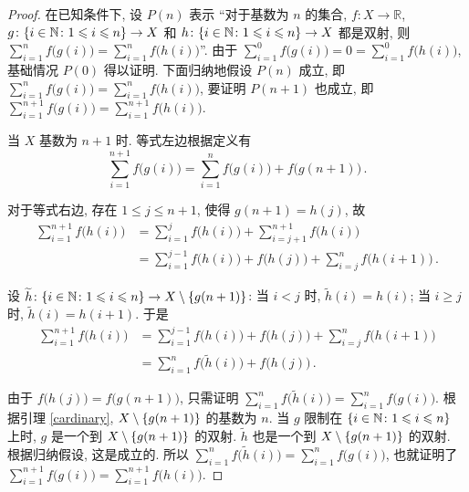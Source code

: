 \documentclass[UTF8]{ctexart}
\theoremstyle{mystyle}
\theoremstyle{myremark}
\theoremstyle{plain}
\newcommand{\R}{\mathbb R}
\newcommand{\N}{\mathbb N}
\DeclarePairedDelimiter\set{\{}{\}}
\begin{document}
\begin{proof}
    在已知条件下, 设 $ P(n) $ 表示 ``对于基数为 $ n $ 的集合, $ f \colon X \to \R $, $ g \colon \set{i \in \N \colon 1 \leqslant i \leqslant n} \to X $ 和 $ h \colon \set{i \in \N \colon 1 \leqslant i \leqslant n} \to X $ 都是双射, 则 $\displaystyle \sum_{i = 1}^{n} f \big( g(i) \big) = \sum_{i = 1}^{n} f \big( h(i) \big) $''. 由于 $\displaystyle \sum_{i = 1}^{0} f \big( g(i) \big) = 0 = \sum_{i = 1}^{0} f \big( h(i) \big) $, 基础情况 $ P(0) $ 得以证明. 下面归纳地假设 $ P(n) $ 成立, 即 $\displaystyle \sum_{i = 1}^{n} f \big( g(i) \big) = \sum_{i = 1}^{n} f \big( h(i) \big) $, 要证明 $ P(n + 1) $ 也成立, 即 $\displaystyle \sum_{i = 1}^{n + 1} f \big( g(i) \big) = \sum_{i = 1}^{n + 1} f \big( h(i) \big) $. 

    当 $ X $ 基数为 $ n + 1 $ 时. 等式左边根据定义有  \[ \sum_{i = 1}^{n + 1} f \big( g(i) \big) = \sum_{i = 1}^{n} f \big( g(i) \big) + f \big( g(n + 1) \big) \,.\]

    对于等式右边, 存在 $ 1 \leqslant j \leqslant n + 1 $, 使得 $ g(n + 1) = h(j) $, 故 
    \begin{align*}
        \sum_{i = 1}^{n + 1} f \big( h(i) \big) &= \sum_{i = 1}^{j} f \big( h(i) \big) + \sum_{i = j + 1}^{n + 1} f \big( h(i) \big) \\
        &= \sum_{i = 1}^{j - 1} f \big( h(i) \big) + f \big( h(j) \big) + \sum_{i = j}^{n} f \big( h(i + 1) \big)\,.
    \end{align*}

    设 $ \widetilde{h} \colon \set{i \in \N \colon 1 \leqslant i \leqslant n} \to X \setminus \set{g(n + 1)} $: 当 $ i < j $ 时, $ \widetilde{h} (i) = h (i) $; 当 $ i \geqslant j $ 时, $ \widetilde{h} (i) = h(i + 1) $. 于是
    \begin{align*}
        \sum_{i = 1}^{n + 1} f \big( h(i) \big) &= \sum_{i = 1}^{j - 1} f \big( h(i) \big) + f \big( h(j) \big) + \sum_{i = j}^{n} f \big( h(i + 1) \big) \\
        &= \sum_{i = 1}^{n} f \big( \widetilde{h}(i) \big) + f \big( h(j) \big) \,.
    \end{align*}

    由于 $ f \big( h(j) \big) = f \big( g(n + 1) \big) $, 只需证明 $\displaystyle \sum_{i = 1}^{n} f \big( \widetilde{h}(i) \big) = \sum_{i = 1}^{n} f \big( g(i) \big) $. 根据引理 \ref{cardinary}, $ X \setminus \set{g(n + 1)} $ 的基数为 $ n $. 当 $ g $ 限制在 $ \set{i \in \N \colon 1 \leqslant i \leqslant n} $ 上时, $ g $ 是一个到 $ X \setminus \set{g(n + 1)} $ 的双射. $ \widetilde{h} $ 也是一个到 $ X \setminus \set{g(n + 1)} $ 的双射. 根据归纳假设, 这是成立的. 所以 $\displaystyle \sum_{i = 1}^{n} f \big( \widetilde{h}(i) \big) = \sum_{i = 1}^{n} f \big( g(i) \big) $, 也就证明了 $\displaystyle \sum_{i = 1}^{n + 1} f \big( g(i) \big) = \sum_{i = 1}^{n + 1} f \big( h(i) \big) $.
\end{proof}
\end{document}
